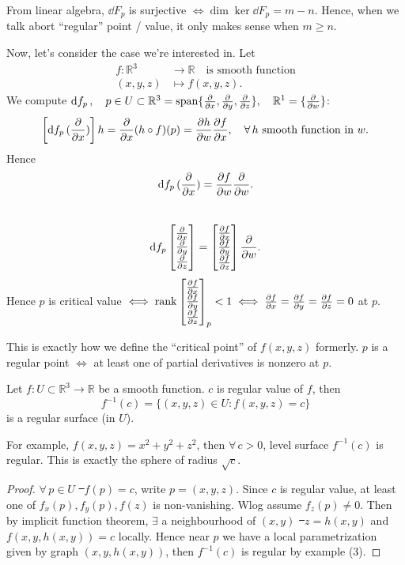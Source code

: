 From linear algebra, \(\dd{F_p}\) is surjective \(\iff \dim\ker\dd{F_p}=m-n\).
Hence, when we talk abort ``regular'' point / value, it only makes sense when
\(m\ge n\).

Now, let's consider the case we're interested in. Let
\begin{align*}
    f\colon\mathbb{R}^3 &\longrightarrow \mathbb{R}\quad\text{is smooth function} \\
    (x,y,z) &\longmapsto f(x,y,z)
.\end{align*}
We compute \(\dd{f_p},\quad p\in U\subset \mathbb{R}^3=\operatorname{span}\{\pdv{x},\pdv{y},
\pdv{z}\},\quad\mathbb{R}^1=\{\pdv{w}\}\): \[
    \left[ \dd{f_p}(\pdv{x}) \right] h=\pdv{x}(h\circ f)(p)=\pdv{h}{w}\pdv{f}{x},
    \quad\forall\, h\text{ smooth function in } w
.\]
Hence \[
    \dd{f_p}(\pdv{x})=\pdv{f}{w}(p)\pdv{w}
.\] \ie\ \[
    \dd{f_p}\begin{bmatrix}
        \pdv{x} \\
        \pdv{y} \\
        \pdv{z}
    \end{bmatrix}
    =\begin{bmatrix}
        \pdv{f}{x} \\
        \pdv{f}{y} \\
        \pdv{f}{z}
    \end{bmatrix}\pdv{w}
.\] Hence \(p\) is critical value \(\iff \rank\begin{bmatrix}
    \pdv{f}{x} \\
    \pdv{f}{y} \\
    \pdv{f}{z}
\end{bmatrix}_p<1
\iff \pdv{f}{x}=\pdv{f}{y}=\pdv{f}{z}=0\) at \(p\).

This is exactly how we define the ``critical point'' of \(f(x,y,z)\) formerly.
\(p\) is a regular point \(\iff \) at least one of partial derivatives is nonzero
at \(p\).

\begin{prop}
    Let \(f\colon U\subset\mathbb{R}^3\to \mathbb{R}\) be a smooth function. \(c\)
    is regular value of \(f\), then \[
        f^{-1}(c)=\{(x,y,z)\in U:f(x,y,z)=c\}
    \] is a regular surface (in \(U\)).
\end{prop}

For example, \(f(x,y,z)=x^2+y^2+z^2\), then \(\forall\,c>0\), level surface
\(f^{-1}(c)\) is regular. This is exactly the sphere of radius \(\sqrt{c}\).

\begin{proof}
    \(\forall\,p\in U\) \st\ \(f(p)=c\), write \(p=(x,y,z)\). Since \(c\) is regular
    value, at least one of \(f_x(p),f_y(p),f(z)\) is non-vanishing. Wlog assume
    \(f_z(p)\neq 0\). Then by implicit function theorem, \(\exists\) a neighbourhood
    of \((x,y)\) \st\ \(z=h(x,y)\) and \(f(x,y,h(x,y))=c\) locally.
    Hence near \(p\) we have a local parametrization given by graph \((x,y,h(x,y))\),
    then \(f^{-1}(c)\) is regular by example (3).
\end{proof}

